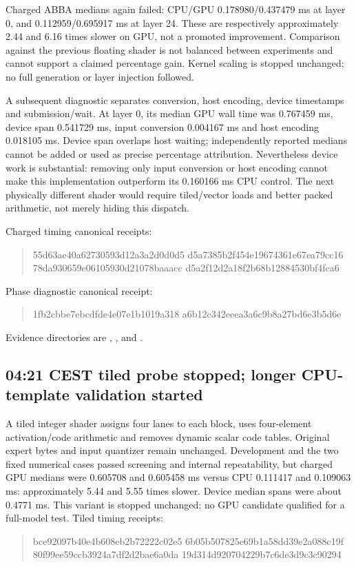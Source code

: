 Charged ABBA medians again failed: CPU/GPU 0.178980/0.437479 ms at layer 0,
and 0.112959/0.695917 ms at layer 24. These are respectively approximately
2.44 and 6.16 times slower on GPU, not a promoted improvement. Comparison
against the previous floating shader is not balanced between experiments
and cannot support a claimed percentage gain. Kernel scaling is stopped
unchanged; no full generation or layer injection followed.

A subsequent diagnostic separates conversion, host encoding, device
timestamps and submission/wait. At layer 0, its median GPU wall time was
0.767459 ms, device span 0.541729 ms, input conversion 0.004167 ms and
host encoding 0.018105 ms. Device span overlaps host waiting; independently
reported medians cannot be added or used as precise percentage attribution.
Nevertheless device work is substantial: removing only input conversion or
host encoding cannot make this implementation outperform its 0.160166 ms
CPU control. The next physically different shader would require tiled/vector
loads and better packed arithmetic, not merely hiding this dispatch.

Charged timing canonical receipts:
\begin{quote}\ttfamily\small
55d63ae40a62730593d12a3a2d0d0d5\allowbreak
d5a7385b2f454e19674361e67ea79cc16\\
78da930659e06105930d21078baaacc\allowbreak
d5a2f12d2a18f2b68b12884530bf4fca6
\end{quote}
Phase diagnostic canonical receipt:
\begin{quote}\ttfamily\small
1fb2cbbe7ebcdfde4e07e1b1019a318\allowbreak
a6b12c342eeea3a6c9b8a27bd6e3b5d6e
\end{quote}
Evidence directories are ,
, and
.

\subsection{04:21 CEST tiled probe stopped; longer CPU-template validation started}
A tiled integer shader assigns four lanes to each block, uses four-element
activation/code arithmetic and removes dynamic scalar code tables. Original
expert bytes and input quantizer remain unchanged. Development and the two
fixed numerical cases passed screening and internal repeatability, but charged
GPU medians were 0.605708 and 0.605458 ms versus CPU 0.111417 and
0.109063 ms: approximately 5.44 and 5.55 times slower. Device median spans
were about 0.4771 ms. This variant is stopped unchanged; no GPU candidate
qualified for a full-model test. Tiled timing receipts:
\begin{quote}\ttfamily\small
bce92097b40e4b608eb2b72222c02e5\allowbreak
6b05b507825e69b1a58dd39e2a088c19f\\
80f99ee59ccb3924a7df2d2bae6a0da\allowbreak
19d314d920704229b7c6de3d9c3c90294
\end{quote}

